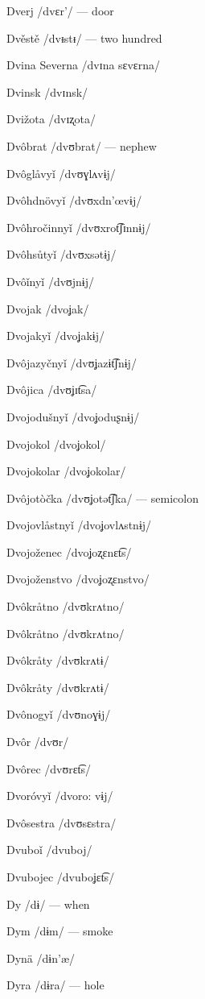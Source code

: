 Dverj /dvɛr’/ — door

Dvěstě /dvᵻstᵻ/ — two hundred

Dvina Severna /dvɪna sɛvɛrna/

Dvinsk /dvɪnsk/

Dvižota /dvɪʐota/

Dvôbrat /dvʊbrat/ — nephew

Dvôglåvyǐ /dvʊɣlʌvɨj/

Dvôhdnövyǐ /dvʊxdn’œvɨj/

Dvôhročinnyǐ /dvʊxrot͡ʃɪnnɨj/

Dvôhsůtyǐ /dvʊxsətɨj/

Dvôǐnyǐ /dvʊjnɨj/

Dvojak /dvoʝak/

Dvojakyǐ /dvoʝakɨj/

Dvôjazyčnyǐ /dvʊʝazɨt͡ʃnɨj/

Dvôjica /dvʊʝɪt͡sa/

Dvojodušnyǐ /dvoʝoduʂnɨj/

Dvojokol /dvoʝokol/

Dvojokolar /dvoʝokolar/

Dvôjotòčka /dvʊʝotət͡ʃka/ — semicolon

Dvojovlåstnyǐ /dvoʝovlʌstnɨj/

Dvojoženec /dvoʝoʐɛnɛt͡s/

Dvojoženstvo /dvoʝoʐɛnstvo/

Dvôkråtno /dvʊkrʌtno/

Dvôkråtno /dvʊkrʌtno/

Dvôkråty /dvʊkrʌtɨ/

Dvôkråty /dvʊkrʌtɨ/

Dvônogyǐ /dvʊnoɣɨj/

Dvôr /dvʊr/

Dvôrec /dvʊrɛt͡s/

Dvoróvyǐ /dvoro: vɨj/

Dvôsestra /dvʊsɛstra/

Dvuboǐ /dvuboj/

Dvubojec /dvuboʝɛt͡s/

Dy /dɨ/ — when

Dym /dɨm/ — smoke

Dynä /dɨn’æ/

Dyra /dɨra/ — hole

